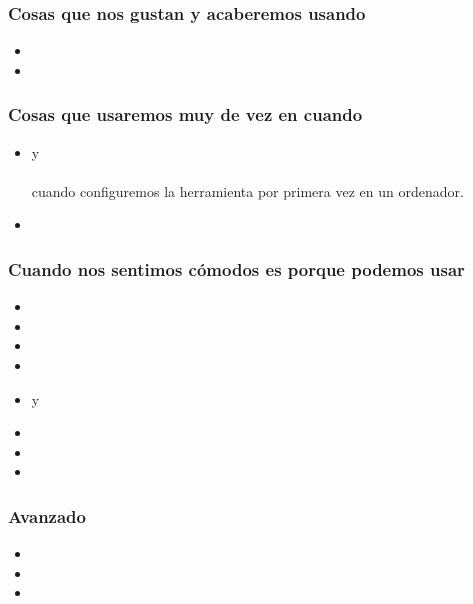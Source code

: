\begin{frame}\frametitle{Cosas que nos gustan y acaberemos usando}
\begin{itemize}
    \item {}
    \item {}
\end{itemize}
\end{frame}

\begin{frame}\frametitle{Cosas que usaremos muy de vez en cuando}
\begin{itemize}
    \item {} y \\
     \\
    cuando configuremos la herramienta por primera vez en un ordenador.
    \item {}
\end{itemize}
\end{frame}

\begin{frame}\frametitle{Cuando nos sentimos cómodos es porque podemos usar}
\begin{itemize}
    \item {}
    \item {}
    \item {}
    \item {}
\end{itemize}
\begin{itemize}
    \item {} y 
    \item {}
    \item {}
    \item {}
\end{itemize}
\end{frame}

\begin{frame}\frametitle{Avanzado}
\begin{itemize}
    \item {}
    \item {}
    \item {}
\end{itemize}
\end{frame}

